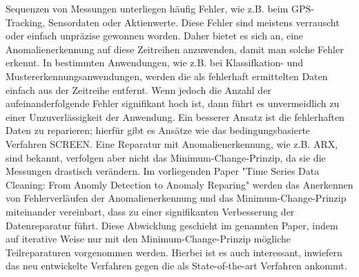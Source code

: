 Sequenzen von Messungen unterliegen häufig Fehler, wie z.B. beim GPS-Tracking,
Sensordaten oder Aktienwerte. Diese Fehler sind meistens verrauscht oder
einfach unpräzise gewonnen worden. Daher bietet es sich an, eine
Anomalienerkennung auf diese Zeitreihen anzuwenden, damit man solche Fehler
erkennt. In bestimmten Anwendungen, wie z.B. bei Klassifkation- und
Mustererkennungsanwendungen, werden die als fehlerhaft ermittelten Daten
einfach aus der Zeitreihe entfernt. Wenn jedoch die Anzahl der
aufeinanderfolgende Fehler signifikant hoch ist, dann führt es unvermeidlich zu
einer Unzuverlässigkeit der Anwendung. Ein besserer Ansatz ist die fehlerhaften
Daten zu reparieren; hierfür gibt es Ansätze wie das bedingungsbasierte
Verfahren SCREEN. Eine Reparatur mit Anomalienerkennung, wie z.B. ARX, sind
bekannt, verfolgen aber nicht das Minimum-Change-Prinzip, da sie die Messungen
drastisch verändern. Im vorliegenden Paper "Time Series Data Cleaning: From
Anomly Detection to Anomaly Reparing" \cite{zhang17} werden das Anerkennen von Fehlerverläufen
der Anomalienerkennung und das Minimum-Change-Prinzip miteinander vereinbart,
dass zu einer signifikanten Verbesserung der Datenreparatur führt. Diese
Abwicklung geschieht im genannten Paper, indem auf iterative Weise nur mit den
Minimum-Change-Prinzip mögliche Teilreparaturen vorgenommen werden. Hierbei ist
es auch interessant, inwiefern das neu entwickelte Verfahren gegen die als
State-of-the-art Verfahren ankommt.
